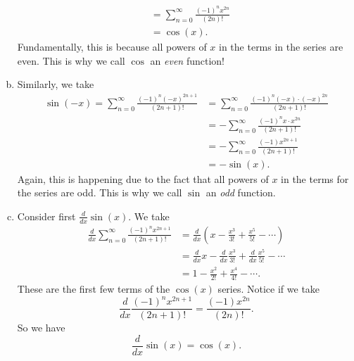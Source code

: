 \documentclass[12pt]{article} %
\begin{document}
\begin{solution}
\begin{enumerate}[(a)]
\begin{align*}
			&= \sum_{n=0}^\infty \frac{(-1)^n x^{2n}}{(2n)!}\\
			&= \cos(x).
		\end{align*}
		Fundamentally, this is because all powers of $x$ in the terms in the series are even.  This is why we call $\cos$ an \emph{even} function!
		\item Similarly, we take
		\begin{align*}
			\sin(-x)=\sum_{n=0}^\infty \frac{(-1)^n (-x)^{2n+1}}{(2n+1)!}&= \sum_{n=0}^\infty \frac{(-1)^n (-x)\cdot (-x)^{2n}}{(2n+1)!}\\
			&= -\sum_{n=0}^\infty \frac{(-1)^n x\cdot x^{2n}}{(2n+1)!}\\
			&= -\sum_{n=0}^\infty \frac{(-1) x^{2n+1}}{(2n+1)!}\\
			&= -\sin(x).
		\end{align*}
		Again, this is happening due to the fact that all powers of $x$ in the terms for the series are odd. This is why we call $\sin$ an \emph{odd} function.
		\item Consider first $\frac{d}{dx} \sin(x)$.  We take
		\begin{align*}
			\frac{d}{dx} \sum_{n=0}^\infty \frac{(-1)^n x^{2n+1}}{(2n+1)!} &= \frac{d}{dx} \left( x-\frac{x^3}{3!}+\frac{x^5}{5!} - \cdots \right)\\
			&= \frac{d}{dx} x -\frac{d}{dx} \frac{x^3}{3!} +\frac{d}{dx} \frac{x^5}{5!} - \cdots\\
			&= 1 - \frac{x^2}{2!} +\frac{x^4}{4!} - \cdots.
		\end{align*}
		These are the first few terms of the $\cos(x)$ series.  Notice if we take
		\[
		\frac{d}{dx} \frac{(-1)^n x^{2n+1}}{(2n+1)!} = \frac{(-1) x^{2n}}{(2n)!}.
		\]
		So we have
		\[
		\frac{d}{dx} \sin(x) = \cos(x).
		\]
		

\end{enumerate}
\end{solution}
\end{document}
